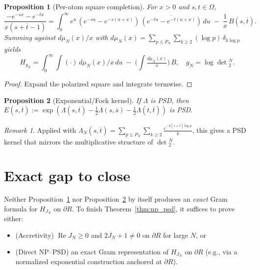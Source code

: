 \documentclass[11pt]{article}
\newtheorem{proposition}{Proposition}
\theoremstyle{remark}
\newtheorem{remark}{Remark}
\newcommand{\ReS}{\operatorname{Re}}
\begin{document}
\begin{proposition}[Per-atom square completion]\label{prop:sq}
For $x>0$ and $s,t\in\Omega$,
\[\frac{-e^{-s x}-e^{-\overline t x}}{x(s+\overline t-1)}=\int_0^\infty e^{u}\,(e^{-su}-e^{-s(u+x)})\,\overline{(e^{-tu}-e^{-t(u+x)})}\,du\; -\;\frac{1}{x}\,B(s,\overline t).\]
Summing against $d\mu_N(x)/x$ with $d\mu_N(x)=\sum_{p\le P_N}\sum_{k\ge2}(\log p)\,\delta_{k\log p}$ yields
\[H_{g_N}=\int_0^\infty\!\int (\cdot)\, d\mu_N(x)/x\,du \; -\;\Big(\int \tfrac{d\mu_N(x)}{x}\Big)\,B,\quad g_N=\log\det{}_2^N.\]
\end{proposition}
\begin{proof}
Expand the polarized square and integrate termwise.
\end{proof}

\begin{proposition}[Exponential/Fock kernel]\label{prop:fock}
If $\Lambda$ is PSD, then $E(s,\overline t):=\exp(\Lambda(s,\overline t)-\tfrac12\Lambda(s,\overline s)-\tfrac12\Lambda(t,\overline t))$ is PSD.
\end{proposition}
\begin{remark}
Applied with $\Lambda_N(s,\overline t)=\sum_{p\le P_N}\sum_{k\ge2}\tfrac{e^{-k(s+\overline t)\log p}}{k}$, this gives a PSD kernel that mirrors the multiplicative structure of $\det{}_2^N$.
\end{remark}

\section*{Exact gap to close}
Neither Proposition~\ref{prop:sq} nor Proposition~\ref{prop:fock} by itself produces an \emph{exact} Gram formula for $H_{J_N}$ on $\partial R$. To finish Theorem~\ref{thm:np_psd}, it suffices to prove either:
\begin{itemize}
  \item (Accretivity) $\ReS J_N\ge0$ and $2J_N+1\ne0$ on $\partial R$ for large $N$, or
  \item (Direct NP--PSD) an exact Gram representation of $H_{J_N}$ on $\partial R$ (e.g., via a normalized exponential construction anchored at $\partial R$).
\end{itemize}
\end{document}
